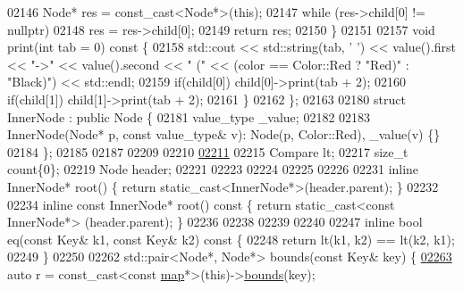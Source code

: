 \begin{DoxyCode}
02146             Node* res = \textcolor{keyword}{const\_cast<}Node*\textcolor{keyword}{>}(\textcolor{keyword}{this});
02147             \textcolor{keywordflow}{while} (res->child[0] != \textcolor{keyword}{nullptr})
02148                 res = res->child[0];
02149             \textcolor{keywordflow}{return} res;
02150         \}
02151 
02157         \textcolor{keywordtype}{void} print(\textcolor{keywordtype}{int} tab = 0)\textcolor{keyword}{ const }\{
02158             std::cout << std::string(tab, \textcolor{charliteral}{' '}) << value().first << \textcolor{stringliteral}{"->"} << 
      value().second << \textcolor{stringliteral}{"   ("} << (color == Color::Red ? \textcolor{stringliteral}{"Red)"} : \textcolor{stringliteral}{"Black)"}) << std::endl;
02159             \textcolor{keywordflow}{if}(child[0]) child[0]->print(tab + 2);
02160             \textcolor{keywordflow}{if}(child[1]) child[1]->print(tab + 2);
02161         \}
02162     \};
02163 
02180     \textcolor{keyword}{struct }InnerNode : \textcolor{keyword}{public} Node \{
02181         value\_type \_value;
02182 
02183         InnerNode(Node* p, \textcolor{keyword}{const} value\_type& v): Node(p, Color::Red), \_value(v)
       \{\}
02184     \};
02185 
02187 
02209 
02210 
\hypertarget{map_8h_source_l02211}{}\hyperlink{classaed2_1_1map_a0e5be36fae0693e4665bd2a615e7550a_a0e5be36fae0693e4665bd2a615e7550a}{02211} 
02215     Compare lt;
02217     \textcolor{keywordtype}{size\_t} count\{0\};
02219     Node header;
02221 
02223 
02224 
02225 
02226 
02231     \textcolor{keyword}{inline} InnerNode* root() \{ \textcolor{keywordflow}{return} \textcolor{keyword}{static\_cast<}InnerNode*\textcolor{keyword}{>}(header.parent); \}
02232 
02234     \textcolor{keyword}{inline} \textcolor{keyword}{const} InnerNode* root()\textcolor{keyword}{ const }\{ \textcolor{keywordflow}{return} \textcolor{keyword}{static\_cast<}\textcolor{keyword}{const }InnerNode*\textcolor{keyword}{>}
      (header.parent); \}
02236 
02238 
02239 
02240 
02247     \textcolor{keyword}{inline} \textcolor{keywordtype}{bool} eq(\textcolor{keyword}{const} Key& k1, \textcolor{keyword}{const} Key& k2)\textcolor{keyword}{ const }\{
02248         \textcolor{keywordflow}{return} lt(k1, k2) == lt(k2, k1);
02249     \}
02250 
02262     std::pair<Node*, Node*> bounds(\textcolor{keyword}{const} Key& key) \{
\hypertarget{map_8h_source_l02263}{}\hyperlink{classaed2_1_1map_a4d903414b3f1f1e6f785342bb3900572_a4d903414b3f1f1e6f785342bb3900572}{02263}         \textcolor{keyword}{auto} r = \textcolor{keyword}{const\_cast<}\textcolor{keyword}{const }\hyperlink{classaed2_1_1map}{map}*\textcolor{keyword}{>}(\textcolor{keyword}{this})->\hyperlink{classaed2_1_1map_a4d903414b3f1f1e6f785342bb3900572_a4d903414b3f1f1e6f785342bb3900572}{bounds}(key);

\end{DoxyCode}
